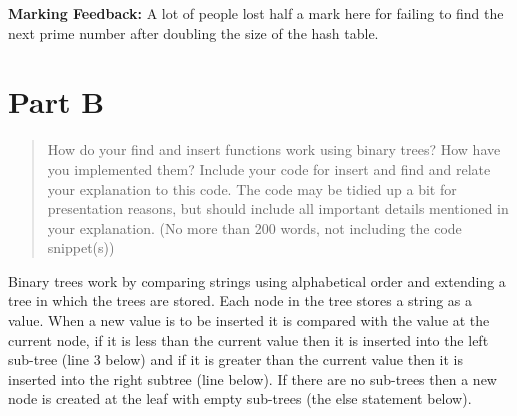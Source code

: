 \documentclass[a4]{article}
\newif\ifc
\newif\ifjava
\newif\ifpython
\begin{document}
{\bf Marking Feedback:}  A lot of people lost half a mark here for failing to find the next prime number after doubling the size of the hash table. 

\section{Part B}

\begin{quote}
How do your find and insert functions work using binary trees? How have you implemented them? Include your code for insert and find and relate your explanation to this code.  The code may be tidied up a bit for presentation reasons, but should include all important details mentioned in your explanation.  (No more than 200 words, not including the code snippet(s))
\end{quote}

\medskip 

Binary trees work by comparing strings using alphabetical order and extending a tree in which the trees are stored.  Each node in the tree stores a string as a value.  When a new value is to be inserted it is compared with the value at the current node, if it is less than the current value then it is inserted into the left sub-tree (line 3 below) and if it is greater than the current value then it is inserted into the right subtree (line \ifc 4 \fi {} \fi \ifpython 5 \fi below).  If there are no sub-trees then a new node is created at the leaf with empty sub-trees (the else statement below).

\ifc
Insert:
\begin{verbatim}
  if(tree){
    int comp = compare(value,tree->value);
    if(comp < 0){ tree->left = insert(value,tree->left); }
    else if(comp > 0){ tree->right = insert(value,tree->right); }
    // if comp == 0 then do nothing as it's a duplicate
  }
  else{
    tree = malloc(sizeof(struct bstree));
    check(tree);
    tree->left  = NULL;
    tree->right = NULL;
    tree->value= strdup(value);
  }
  return tree;
\end{verbatim}
\fi

\ifjava
\begin{verbatim}
if(tree()){
            int comp = value.compareTo(this.value);
            if (comp < 0) {
                this.left.insert(value);
            } else if (comp > 0) {
                this.right.insert(value);
            }
            // if comp == 0 then do nothing as it's a duplicate
        }
        else{
            left = new bstree(this.config);
            right = new bstree(this.config);
            this.value = value;
        }
\end{verbatim}
\fi
\end{document}
